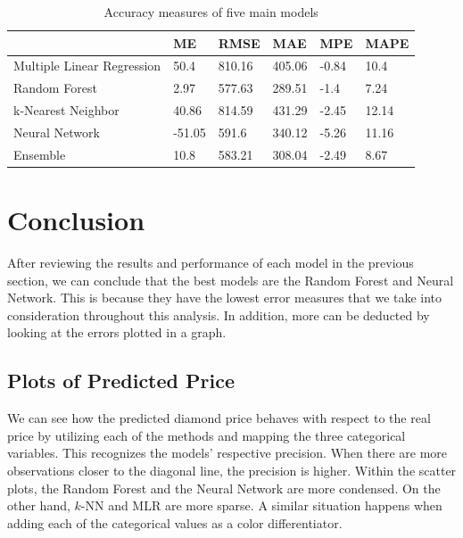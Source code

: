 \documentclass[
  paper=a4,
  ,captions=tableheading
]{scrartcl}
\begin{document}
\begin{table}[!h]

\caption{\label{tab:ensemble error table}Accuracy measures of five main models}
\centering
\begin{tabu} to 
\hline
  & ME & RMSE & MAE & MPE & MAPE\\
\hline
Multiple Linear Regression & 50.4 & 810.16 & 405.06 & -0.84 & 10.4\\
\hline
Random Forest & 2.97 & 577.63 & 289.51 & -1.4 & 7.24\\
\hline
k-Nearest Neighbor & 40.86 & 814.59 & 431.29 & -2.45 & 12.14\\
\hline
Neural Network & -51.05 & 591.6 & 340.12 & -5.26 & 11.16\\
\hline
Ensemble & 10.8 & 583.21 & 308.04 & -2.49 & 8.67\\
\hline
\end{tabu}
\end{table}

\hypertarget{conclusion}{%
\section{Conclusion}\label{conclusion}}

After reviewing the results and performance of each model in the
previous section, we can conclude that the best models are the Random
Forest and Neural Network. This is because they have the lowest error
measures that we take into consideration throughout this analysis. In
addition, more can be deducted by looking at the errors plotted in a
graph.

\hypertarget{plots-of-predicted-price}{%
\subsection{Plots of Predicted Price}\label{plots-of-predicted-price}}

We can see how the predicted diamond price behaves with respect to the
real price by utilizing each of the methods and mapping the three
categorical variables. This recognizes the models' respective precision.
When there are more observations closer to the diagonal line, the
precision is higher. Within the scatter plots, the Random Forest and the
Neural Network are more condensed. On the other hand, \(k\)-NN and MLR
are more sparse. A similar situation happens when adding each of the
categorical values as a color differentiator.
\end{document}
